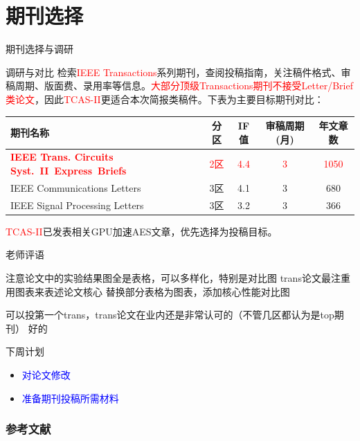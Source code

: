\documentclass{beamer}
\begin{document}
\section{期刊选择}
\begin{frame}{期刊选择与调研}
  \begin{block}{调研与对比}
    检索\textcolor{red}{IEEE Transactions}系列期刊，查阅投稿指南，关注稿件格式、审稿周期、版面费、录用率等信息。\textcolor{red}{大部分顶级Transactions期刊不接受Letter/Brief类论文}，因此\textcolor{red}{TCAS-II}更适合本次简报类稿件。下表为主要目标期刊对比：
    \vspace{1ex}
    \begin{center}
      \scriptsize
      \begin{tabular}{lcccc}
        \toprule
        期刊名称 & 分区 & IF值 & 审稿周期(月) & 年文章数 \\
        \midrule
        \textcolor{red}{\textbf{IEEE Trans. Circuits Syst. II Express Briefs}} & \textcolor{red}{2区} & \textcolor{red}{4.4} & \textcolor{red}{3} & \textcolor{red}{1050} \\
        IEEE Communications Letters  & 3区 & 4.1 & 3 & 680 \\
        IEEE Signal Processing Letters  & 3区 & 3.2 & 3 & 366 \\
        \bottomrule
      \end{tabular}
    \end{center}
    \vspace{1ex}
    \textcolor{red}{TCAS-II}已发表相关GPU加速AES文章\cite{Lee2022Jeong}，优先选择为投稿目标。
  \end{block}
\end{frame}

\begin{frame}{老师评语}
  \begin{alertblock}{注意论文中的实验结果图全是表格，可以多样化，特别是对比图
    trans论文最注重用图表来表述论文核心}
    替换部分表格为图表，添加核心性能对比图
  \end{alertblock}
  \begin{alertblock}{可以投第一个trans，trans论文在业内还是非常认可的（不管几区都认为是top期刊）}
    好的
  \end{alertblock}
  \begin{block}{下周计划}
    \begin{itemize}
      \item \textcolor{blue}{对论文修改}
      \item \textcolor{blue}{准备期刊投稿所需材料}
    \end{itemize}
  \end{block}
\end{frame}

\begin{frame}
  \frametitle{参考文献}
  
  
\end{frame}
\end{document}
